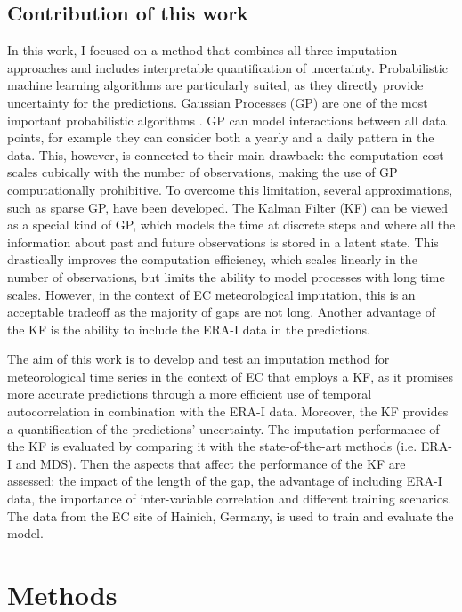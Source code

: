 \documentclass{article}
\let\Oldsection\section
\renewcommand{\section}{\FloatBarrier\Oldsection}
\let\Oldsubsection\subsection
\renewcommand{\subsection}{\FloatBarrier\Oldsubsection}
\begin{document}
\subsection{Contribution of this work}
In this work, I focused on a method that combines all three imputation approaches and includes interpretable quantification of uncertainty. Probabilistic machine learning algorithms are particularly suited, as they directly provide uncertainty for the predictions.
Gaussian Processes (GP) are one of the most important probabilistic algorithms \cite{2020_hennig_pml}. GP can model interactions between all data points, for example they can consider both a yearly and a daily pattern in the data. This, however, is connected to their main drawback: the computation cost scales cubically with the number of observations, making the use of GP computationally prohibitive. To overcome this limitation, several approximations, such as sparse GP, have been developed.
The Kalman Filter (KF) can be viewed as a special kind of GP, which models the time at discrete steps and where all the information about past and future observations is stored in a latent state. This drastically improves the computation efficiency, which scales linearly in the number of observations, but limits the ability to model processes with long time scales. However, in the context of EC meteorological imputation, this is an acceptable tradeoff as the majority of gaps are not long. Another advantage of the KF is the ability to include the ERA-I data in the predictions.

The aim of this work is to develop and test an imputation method for meteorological time series in the context of EC that employs a KF, as it promises more accurate predictions through a more efficient use of temporal autocorrelation in combination with the ERA-I data. Moreover, the KF provides a quantification of the predictions' uncertainty.
The imputation performance of the KF is evaluated by comparing it with the state-of-the-art methods (i.e. ERA-I and MDS). Then the aspects that affect the performance of the KF are assessed: the impact of the length of the gap, the advantage of including ERA-I data, the importance of inter-variable correlation and different training scenarios. The data from the EC site of Hainich, Germany, is used to train and evaluate the model.


\section{Methods}
\end{document}
